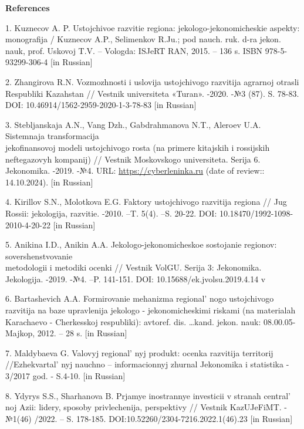 \begin{center}
{\bfseries References}
\end{center}

\begin{references}
1. Kuznecov A. P. Ustojchivoe razvitie regiona: jekologo-jekonomicheskie
aspekty: monografija / Kuznecov A.P., Selimenkov R.Ju.; pod nauch. ruk.
d-ra jekon. nauk, prof. Uskovoj T.V. -- Vologda: ISJeRT RAN, 2015. --
136 s. ISBN 978-5-93299-306-4 {[}in Russian{]}

2. Zhangirova R.N. Vozmozhnosti i uslovija ustojchivogo razvitija
agrarnoj otrasli Respubliki Kazahstan // Vestnik universiteta «Turan».
-2020. -№3 (87). S. 78-83. DOI: 10.46914/1562-2959-2020-1-3-78-83 {[}in
Russian{]}

3. Stebljanskaja A.N., Vang Dzh., Gabdrahmanova N.T., Aleroev U.A.
Sistemnaja transformacija \\jekofinansovoj modeli ustojchivogo rosta (na
primere kitajskih i rossijskih neftegazovyh kompanij) // Vestnik
Moskovskogo universiteta. Serija 6. Jekonomika. -2019. -№4. URL:
\href{https://cyberleninka.ru/article/n/sistemnaya-transformatsiya-ekofinansovoy-modeli-ustoychivogo-rosta-na-primere-kitayskih-i-rossiyskih-neftegazovyh-kompaniy}{https://cyberleninka.ru}
(date of review:: 14.10.2024). {[}in Russian{]}

4. Kirillov S.N., Molotkova E.G. Faktory ustojchivogo razvitija regiona
// Jug Rossii: jekologija, razvitie. -2010. --T. 5(4). --S. 20-22. DOI:
10.18470/1992-1098-2010-4-20-22 {[}in Russian{]}

5. Anikina I.D., Anikin A.A. Jekologo-jekonomicheskoe sostojanie
regionov: sovershenstvovanie \\metodologii i metodiki ocenki // Vestnik
VolGU. Serija 3: Jekonomika. Jekologija. -2019. -№4. --P. 141-151. DOI:
10.15688/ek.jvolsu.2019.4.14 v

6. Bartashevich A.A. Formirovanie mehanizma
regional' nogo ustojchivogo razvitija na baze upravlenija
jekologo -
jekonomicheskimi riskami (na materialah Karachaevo -
Cherkesskoj respubliki): avtoref. dis. \ldots kand. jekon. nauk:
08.00.05- Majkop, 2012. -- 28 s. {[}in Russian{]}

7. Maldybaeva G. Valovyj regional' nyj produkt: ocenka
razvitija territorij //Ezhekvartal' nyj nauchno --
informacionnyj zhurnal Jekonomika i statistika - 3/2017 god. - S.4-10.
{[}in Russian{]}

8. Ydyrys S.S., Sharhanova B. Prjamye inostrannye investicii v stranah
central' noj Azii: lidery, sposoby privlechenija,
perspektivy // Vestnik KazUJeFiMT. -№1(46) /2022. -- S. 178-185.
DOI:10.52260/2304-7216.2022.1(46).23 {[}in Russian{]}


\end{references}
